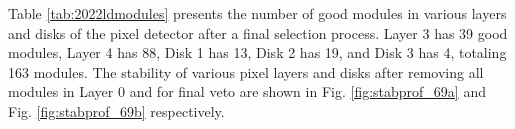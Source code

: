Table \ref{tab:2022ldmodules} presents the number of good modules in various layers and disks of the pixel detector after a final selection process. Layer 3 has 39 good modules, Layer 4 has 88, Disk 1 has 13, Disk 2 has 19, and Disk 3 has 4, totaling 163 modules. The stability of various pixel layers and disks after removing all modules in Layer 0 and for final veto are shown in Fig. \ref{fig:stabprof_69a}  and Fig. \ref{fig:stabprof_69b} respectively.

